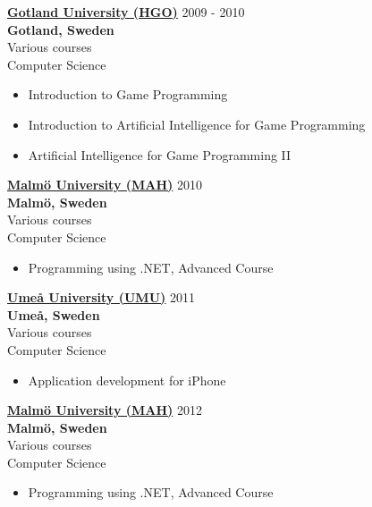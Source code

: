 \documentclass[margin]{res}
\begin{document}
\begin{resume}
		     
		   	{\bf \href{http://www.hgo.se/}{Gotland University (HGO)}} \hfill 2009
			- 2010 \\ 
			{\bf Gotland, Sweden} \\
			Various courses \\
			Computer Science \\
		    \begin{itemize}  \itemsep -2pt %
          		\item Introduction to Game Programming
          		\item Introduction to Artificial Intelligence for Game Programming
          		\item Artificial Intelligence for Game Programming II 
    		\end{itemize}
    		
    		{\bf \href{http://www.mah.se/}{Malmö University (MAH)}} \hfill 2010 \\
			{\bf Malmö, Sweden} \\
			Various courses \\
			Computer Science \\
		    \begin{itemize}  \itemsep -2pt %
		       	\item Programming using .NET, Advanced Course
		    \end{itemize}
		    
		    {\bf \href{http://www.umu.se/}{Umeå University (UMU)}} \hfill 2011 \\
			{\bf Umeå, Sweden} \\
			Various courses \\
			Computer Science \\
			\begin{itemize}  \itemsep -2pt %
		       	\item Application development for iPhone
		    \end{itemize}
		    
		 {\bf \href{http://www.kau.se/}{Malmö University (MAH)}} \hfill 2012 \\
			{\bf Malmö, Sweden} \\
			Various courses \\
			Computer Science \\
		    \begin{itemize}  \itemsep -2pt %
		       	\item Programming using .NET, Advanced Course
		    \end{itemize}
		    

\end{resume}
\end{document}
